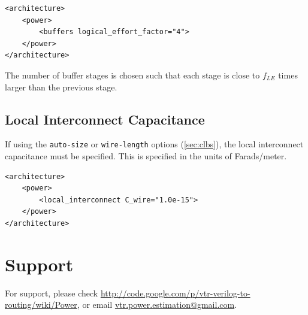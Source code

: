 \documentclass[letterpaper,twoside,10pt]{article}
\begin{document}
\begin{BVerbatim}[bgcolor=LightGray, boxwidth=\textwidth] 
<architecture>
	<power>
		<buffers logical_effort_factor="4">
	</power>
</architecture>
\end{BVerbatim}

The number of buffer stages is chosen such that each stage is close to $f_{LE}$ times larger than the previous stage.






\subsection{Local Interconnect Capacitance} \label{sec:local_interc_cap}
If using the \texttt{auto-size} or \texttt{wire-length} options (\autoref{sec:clbs}), the local interconnect capacitance must be specified.  This is specified in the units of Farads/meter.

\begin{BVerbatim}[bgcolor=LightGray, boxwidth=\textwidth] 
<architecture>
	<power>
		<local_interconnect C_wire="1.0e-15">
	</power>
</architecture>
\end{BVerbatim}



\newpage
\section{Support}
For support, please check \url{http://code.google.com/p/vtr-verilog-to-routing/wiki/Power}, or email \href{mailto:vtr.power.estimation@gmail.com}{vtr.power.estimation@gmail.com}.
\end{document}
